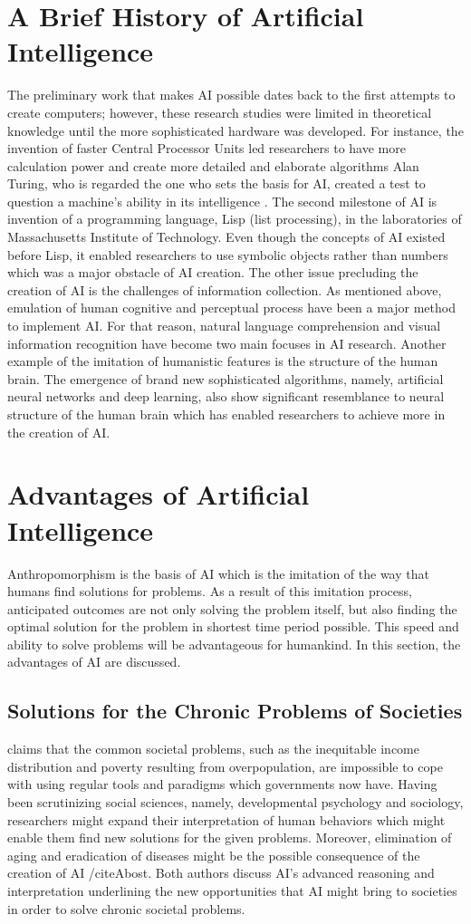 \documentclass[man]{apa6}
\begin{document}
\section{A Brief History of Artificial Intelligence}
The preliminary work that makes AI possible dates back to the first attempts to create computers; however, these research studies were limited in theoretical knowledge until the more sophisticated hardware was developed. For instance, the invention of faster Central Processor Units led researchers to have more calculation power and create more detailed and elaborate algorithms \cite{bost} Alan Turing, who is regarded the one who sets the basis for AI, created a test to question a machine's ability in its intelligence \cite{gre}. The second milestone of AI is invention of a programming language, Lisp (list processing), in the laboratories of Massachusetts Institute of Technology. Even though the concepts of AI existed before Lisp, it enabled researchers to use symbolic objects rather than numbers which was a major obstacle of AI creation. The other issue precluding the creation of AI is the challenges of information collection. As mentioned above, emulation of human cognitive and perceptual process have been a major method to implement AI. For that reason, natural language comprehension and visual information recognition have become two main focuses in AI research. Another example of the imitation of humanistic features is the structure of the human brain. The emergence of brand new sophisticated algorithms, namely, artificial neural networks and deep learning, also show significant resemblance to neural structure of the human brain which has enabled researchers to achieve more in the creation of AI.
\section{Advantages of Artificial Intelligence}
Anthropomorphism is the basis of AI which is the imitation of the way that humans find solutions for problems. As a result of this imitation process, anticipated outcomes are not only solving the problem itself, but also finding the optimal solution for the problem in shortest time period possible. This speed and ability to solve problems will be advantageous for humankind. In this section, the advantages of AI are discussed. 
\subsection{Solutions for the Chronic Problems of Societies}
 claims that the common societal problems, such as the inequitable income distribution and poverty resulting from overpopulation, are impossible to cope with using regular tools and paradigms which governments now have. Having been scrutinizing social sciences, namely, developmental psychology and sociology, researchers might expand their interpretation of human behaviors which might enable them find new solutions for the given problems. Moreover, elimination of aging and eradication of diseases might be the possible consequence of the creation of AI /citeA{bost}. Both authors discuss AI's advanced reasoning and interpretation underlining the new opportunities that AI might bring to societies in order to solve chronic societal problems.
\end{document}
